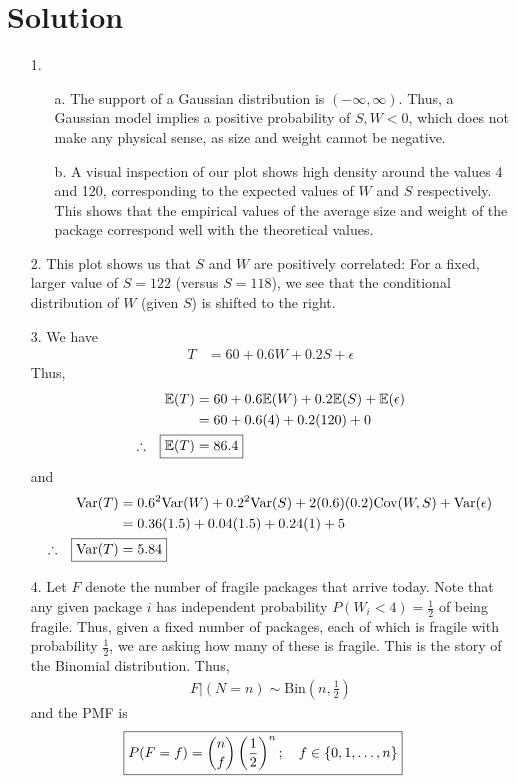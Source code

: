\documentclass{harvardml}
\theoremstyle{definition}
\theoremstyle{plain}
\newenvironment{solution}
  {\color{blue}\section*{Solution}}
{}
\begin{document}
\begin{solution}

\begin{enumerate}
    \item [1.] 
    \begin{enumerate}
        \item[a.] The support of a Gaussian distribution is $(-\infty, \infty)$. Thus, a Gaussian model implies a positive probability of $S, W < 0$, which does not make any physical sense, as size and weight cannot be negative.
        \item[b.] A visual inspection of our plot shows high density around the values 4 and 120, corresponding to the expected values of $W$ and $S$ respectively. This shows that the empirical values of the average size and weight of the package correspond well with the theoretical values.
    \end{enumerate}

    \item[2.] This plot shows us that $S$ and $W$ are positively correlated: For a fixed, larger value of $S=122$ (versus $S=118$), we see that the conditional distribution of $W$ (given $S$) is shifted to the right.

    \item[3.] We have
    \begin{align*}
        T &= 60 + 0.6W + 0.2S + \epsilon
    \end{align*}
    Thus,
    \begin{align*}
        \mathbb{E}(T) &= 60 + 0.6\mathbb{E}(W) + 0.2\mathbb{E}(S) + \mathbb{E}(\epsilon) \\
        &= 60 + 0.6(4) + 0.2(120) + 0 \\
        \therefore \quad \Aboxed{ \mathbb{E}(T) &= 86.4 }
    \end{align*}
    and
    \begin{align*}
        \text{Var}(T) &= 0.6^2 \text{Var}(W) + 0.2^2\text{Var}(S) + 2(0.6)(0.2)\text{Cov}(W,S) + \text{Var}(\epsilon) \\
        &= 0.36(1.5) + 0.04(1.5) + 0.24(1) + 5 \\
        \therefore \quad \Aboxed{ \text{Var}(T) &= 5.84 }
    \end{align*}

    \item[4.] Let $F$ denote the number of fragile packages that arrive today. Note that any given package $i$ has independent probability $P(W_i < 4) = \frac{1}{2}$ of being fragile. Thus, given a fixed number of packages, each of which is fragile with probability $\frac{1}{2}$, we are asking how many of these is fragile. This is the story of the Binomial distribution. Thus,
    \begin{align*}
        \boxed{ F | (N=n) \sim \text{Bin}\left(n, \frac{1}{2}\right) }
    \end{align*}
    and the PMF is
    \begin{align*}
        \Aboxed{ P(F=f) &= \binom{n}{f}\left(\frac{1}{2}\right)^n; \quad f \in \{0,1,\ldots,n\} }
    \end{align*}


\end{enumerate}
\end{solution}
\end{document}
